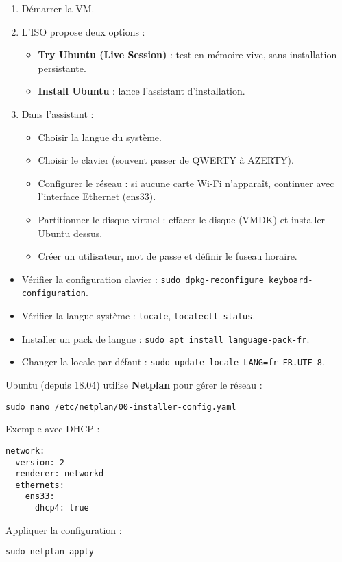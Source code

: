 \documentclass[11pt,a4paper]{article}
\begin{document}
\begin{tcolorbox}[title={4. Lancement de l’ISO et choix d’installation}]
\begin{enumerate}
  \item Démarrer la VM.  
  \item L’ISO propose deux options :
    \begin{itemize}
      \item \textbf{Try Ubuntu (Live Session)} : test en mémoire vive, sans installation persistante.  
      \item \textbf{Install Ubuntu} : lance l’assistant d’installation.  
    \end{itemize}
  \item Dans l’assistant :
    \begin{itemize}
      \item Choisir la langue du système.  
      \item Choisir le clavier (souvent passer de QWERTY à AZERTY).  
      \item Configurer le réseau : si aucune carte Wi-Fi n’apparaît, continuer avec l’interface Ethernet (ens33).  
      \item Partitionner le disque virtuel : effacer le disque (VMDK) et installer Ubuntu dessus.  
      \item Créer un utilisateur, mot de passe et définir le fuseau horaire.  
    \end{itemize}
\end{enumerate}
\end{tcolorbox}

\begin{tcolorbox}[title={5. Gestion du clavier et des locales}]
\begin{itemize}
  \item Vérifier la configuration clavier : \texttt{sudo dpkg-reconfigure keyboard-configuration}.  
  \item Vérifier la langue système : \texttt{locale}, \texttt{localectl status}.  
  \item Installer un pack de langue : \texttt{sudo apt install language-pack-fr}.  
  \item Changer la locale par défaut : \texttt{sudo update-locale LANG=fr\_FR.UTF-8}.
\end{itemize}
\end{tcolorbox}

\begin{tcolorbox}[title={6. Netplan et configuration réseau}]
Ubuntu (depuis 18.04) utilise \textbf{Netplan} pour gérer le réseau :
\begin{verbatim}
sudo nano /etc/netplan/00-installer-config.yaml
\end{verbatim}

Exemple avec DHCP :
\begin{verbatim}
network:
  version: 2
  renderer: networkd
  ethernets:
    ens33:
      dhcp4: true
\end{verbatim}

Appliquer la configuration :
\begin{verbatim}
sudo netplan apply
\end{verbatim}
\end{tcolorbox}
\end{document}
